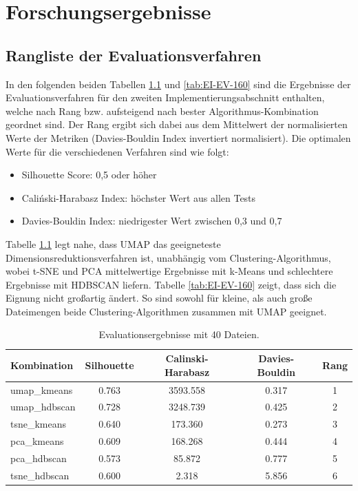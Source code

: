 \chapter{Forschungsergebnisse}

\section{Rangliste der Evaluationsverfahren}
In den folgenden beiden Tabellen \ref{tab:EI-EV-20} und \ref{tab:EI-EV-160} sind die Ergebnisse der Evaluationsverfahren für den zweiten Implementierungsabschnitt enthalten, welche nach Rang bzw. aufsteigend nach bester Algorithmus-Kombination geordnet sind. Der Rang ergibt sich dabei aus dem Mittelwert der normalisierten Werte der Metriken (Davies-Bouldin Index invertiert normalisiert). Die optimalen Werte für die verschiedenen Verfahren sind wie folgt:
\begin{itemize}
    \item Silhouette Score: 0,5 oder höher
    \item Caliński-Harabasz Index: höchster Wert aus allen Tests
    \item Davies-Bouldin Index: niedrigester Wert zwischen 0,3 und 0,7
\end{itemize}
Tabelle \ref{tab:EI-EV-20} legt nahe, dass UMAP das geeigneteste Dimensionsreduktionsverfahren ist, unabhängig vom Clustering-Algorithmus, wobei t-SNE und PCA mittelwertige Ergebnisse mit k-Means und schlechtere Ergebnisse mit HDBSCAN liefern.
Tabelle \ref{tab:EI-EV-160} zeigt, dass sich die Eignung nicht großartig ändert. So sind sowohl für kleine, als auch große Dateimengen beide Clustering-Algorithmen zusammen mit UMAP geeignet.

\setlength{\tabcolsep}{5.5pt}
\begin{table}[h]
\centering
\begin{tabular}{lcccc}
\hline
\textbf{Kombination} & \textbf{Silhouette} & \textbf{Calinski-Harabasz} & \textbf{Davies-Bouldin} & \textbf{Rang} \\
\hline
umap\_kmeans    & 0.763 & 3593.558 & 0.317 & 1 \\
umap\_hdbscan   & 0.728 & 3248.739 & 0.425 & 2 \\
tsne\_kmeans    & 0.640 & 173.360  & 0.273 & 3 \\
pca\_kmeans     & 0.609 & 168.268  & 0.444 & 4 \\
pca\_hdbscan    & 0.573 & 85.872   & 0.777 & 5 \\
tsne\_hdbscan   & 0.600 & 2.318    & 5.856 & 6 \\
\hline
\end{tabular}
\caption{Evaluationsergebnisse mit 40 Dateien.}
\label{tab:EI-EV-20}
\end{table}

